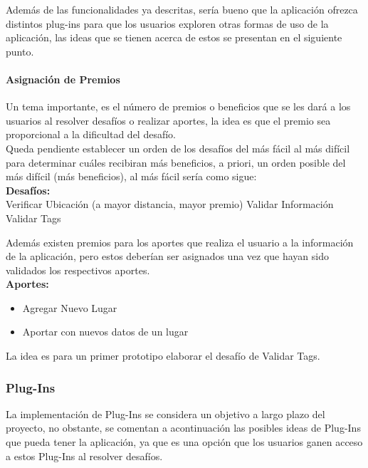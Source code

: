 \documentclass[10pt,letterpaper]{article}
\begin{document}
Además de las funcionalidades ya descritas, sería bueno que la aplicación ofrezca distintos plug-ins para que los usuarios exploren otras formas de uso de la aplicación, las ideas que se tienen acerca de estos se presentan en el siguiente punto.

\paragraph{Asignación de Premios}

Un tema importante, es el número de premios o beneficios que se les dará a los usuarios al resolver desafíos o realizar aportes, la idea es que el premio sea proporcional a la dificultad del desafío.\\

Queda pendiente establecer un orden de los desafíos del más fácil al más difícil para determinar cuáles recibiran más beneficios, a priori, un orden posible del más difícil (más beneficios), al más fácil sería como sigue:\\

\textbf{Desafíos:}\\

Verificar Ubicación (a mayor distancia, mayor premio)
Validar Información
Validar Tags

Además existen premios para los aportes que realiza el usuario a la información de la aplicación, pero estos deberían ser asignados una vez que hayan sido validados los respectivos aportes.\\

\textbf{Aportes:}\\

\begin{itemize}
\item Agregar Nuevo Lugar
\item Aportar con nuevos datos de un lugar
\end{itemize}


La idea es para un primer prototipo elaborar el desafío de Validar Tags.

\subsubsection{Plug-Ins}

La implementación de Plug-Ins se considera un objetivo a largo plazo del proyecto, no obstante, se comentan a acontinuación las posibles ideas de Plug-Ins que pueda tener la aplicación, ya que es una opción que los usuarios ganen acceso a estos Plug-Ins al resolver desafíos.
\end{document}
